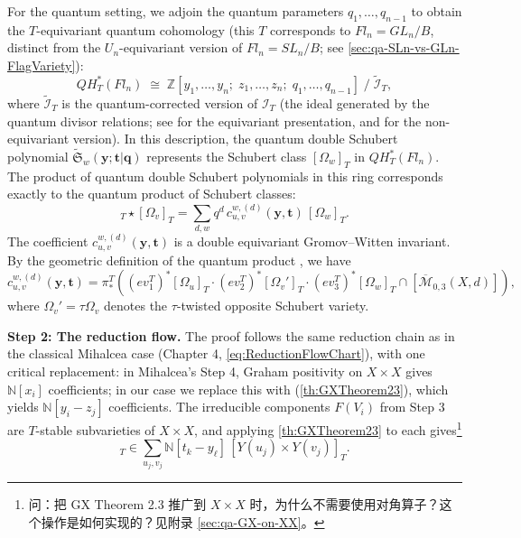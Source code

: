 For the quantum setting, we adjoin the quantum parameters $q_1,\ldots,q_{n-1}$ to obtain the $T$-equivariant quantum cohomology (this $T$ corresponds to $Fl_n = GL_n/B$, distinct from the $U_n$-equivariant version of $Fl_n = SL_n/B$; see \cref{sec:qa-SLn-vs-GLn-FlagVariety}):
\begin{equation}
QH_T^*(Fl_n) \;\cong\; \mathbb{Z}[y_1,\ldots,y_n;\; z_1,\ldots,z_n;\; q_1,\ldots,q_{n-1}] \;/\; \widetilde{\mathcal{I}}_T,
\label{eq:TQuantumBorelIsomorphism}
\end{equation}
where $\widetilde{\mathcal{I}}_T$ is the quantum-corrected version of $\mathcal{I}_T$ (the ideal generated by the quantum divisor relations; see \cite[Theorem~2]{Kim1996} for the equivariant presentation, and \cite{KM} for the non-equivariant version). In this description, the quantum double Schubert polynomial $\widetilde{\mathfrak{S}}_w(\mathbf{y};\mathbf{t}|\mathbf{q})$ represents the Schubert class $[\Omega_w]_T$ in $QH_T^*(Fl_n)$. The product of quantum double Schubert polynomials in this ring corresponds exactly to the quantum product of Schubert classes:
\begin{equation}
[\Omega_u]_T \star [\Omega_v]_T = \sum_{d,w} q^d\, c_{u,v}^{w,(d)}(\mathbf{y},\mathbf{t})\,[\Omega_w]_T.
\label{eq:QuantumDoubleClassProduct}
\end{equation}
The coefficient $c_{u,v}^{w,(d)}(\mathbf{y},\mathbf{t})$ is a double equivariant Gromov--Witten invariant. By the geometric definition of the quantum product \cite[Section 6]{Mihalcea}, we have
\begin{equation}
c_{u,v}^{w,(d)}(\mathbf{y},\mathbf{t}) = \pi_*^T\!\left((ev_1^T)^*[\Omega_u]_T \cdot (ev_2^T)^*[\Omega_v']_T \cdot (ev_3^T)^*[\Omega_w]_T \cap [\overline{\mathcal{M}}_{0,3}(X,d)]\right),
\label{eq:QuantumDoubleCoefficientGeometric}
\end{equation}
where $\Omega_v' = \tau\Omega_v$ denotes the $\tau$-twisted opposite Schubert variety.

\medskip
\noindent\textbf{Step 2: The reduction flow.} The proof follows the same reduction chain as in the classical Mihalcea case (Chapter 4, \cref{eq:ReductionFlowChart}), with one critical replacement: in Mihalcea's Step 4, Graham positivity on $X \times X$ gives $\mathbb{N}[x_i]$ coefficients; in our case we replace this with \cite[Theorems 2.3 and 2.4]{GX2025} (\cref{th:GXTheorem23}), which yields $\mathbb{N}[y_i-z_j]$ coefficients. The irreducible components $F(V_i)$ from Step 3 are $T$-stable subvarieties of $X \times X$, and applying \cref{th:GXTheorem23} to each gives\footnote{问：把 GX Theorem 2.3 推广到 $X \times X$ 时，为什么不需要使用对角算子？这个操作是如何实现的？见附录 \cref{sec:qa-GX-on-XX}。}
\begin{equation}
[F(V_i)]_T \in \sum_{u_j, v_j} \mathbb{N}[t_k - y_\ell]\, [Y(u_j) \times Y(v_j)]_T.
\label{eq:GXTheoremOnXX}
\end{equation}

